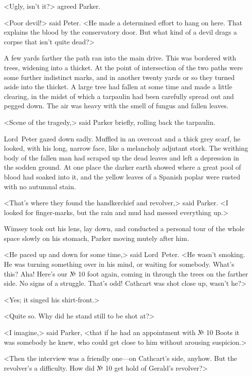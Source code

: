 <Ugly, isn't it?> agreed Parker.

<Poor devil!> said Peter. <He made a determined effort to hang on here. That explains the blood by the conservatory door. But what kind of a devil drags a corpse that isn't quite dead?>

A few yards farther the path ran into the main drive. This was bordered with trees, widening into a thicket. At the point of intersection of the two paths were some further indistinct marks, and in another twenty yards or so they turned aside into the thicket. A large tree had fallen at some time and made a little clearing, in the midst of which a tarpaulin had been carefully spread out and pegged down. The air was heavy with the smell of fungus and fallen leaves.

<Scene of the tragedy,> said Parker briefly, rolling back the tarpaulin.

Lord~Peter gazed down sadly. Muffled in an overcoat and a thick grey scarf, he looked, with his long, narrow face, like a melancholy adjutant stork. The writhing body of the fallen man had scraped up the dead leaves and left a depression in the sodden ground. At one place the darker earth showed where a great pool of blood had soaked into it, and the yellow leaves of a Spanish poplar were rusted with no autumnal stain.

<That's where they found the handkerchief and revolver,> said Parker. <I looked for finger-marks, but the rain and mud had messed everything up.>

Wimsey took out his lens, lay down, and conducted a personal tour of the whole space slowly on his stomach, Parker moving mutely after him.

<He paced up and down for some time,> said Lord~Peter. <He wasn't smoking. He was turning something over in his mind, or waiting for somebody. What's this? Aha! Here's our № 10 foot again, coming in through the trees on the farther side. No signs of a struggle. That's odd! Cathcart was shot close up, wasn't he?>

<Yes; it singed his shirt-front.>

<Quite so. Why did he stand still to be shot at?>

<I imagine,> said Parker, <that if he had an appointment with № 10 Boots it was somebody he knew, who could get close to him without arousing suspicion.>

<Then the interview was a friendly one—on Cathcart's side, anyhow. But the revolver's a difficulty. How did № 10 get hold of Gerald's revolver?>

